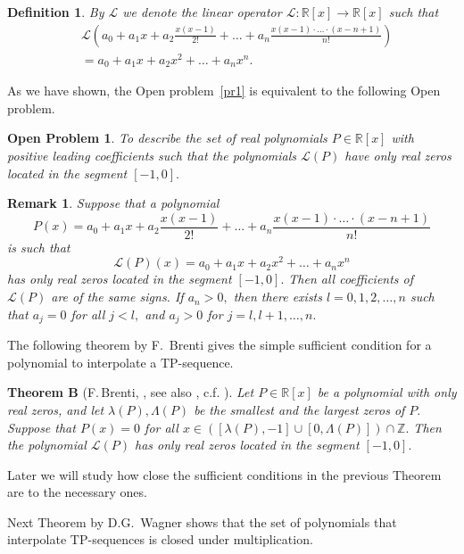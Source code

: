 \documentclass[12pt]{amsart}
\newcounter{count}
\numberwithin{count}{section}
\newtheorem{Remark}[count]{Remark}
\newtheorem{Definition}[count]{Definition}
\newtheorem{Problem}[count]{Open Problem}
\begin{document}
\begin{Definition} By $\mathcal{L}$ we denote the linear operator  $\mathcal{L} : \mathbb{R}[x] \rightarrow 
\mathbb{R}[x]$ such that
\begin{eqnarray}
\label{f4}
&  \mathcal{L}(a_0 + a_1 x +a_2 \frac{x(x-1)}{2!} 
+  \ldots +a_n \frac{x(x-1)\cdot \ldots \cdot (x-n+1)}{n!})
\\  \nonumber &
= a_0 +a_1 x +a_2 x^2 + \ldots + a_n x^n.
\end{eqnarray}
\end{Definition}
As we have shown, the Open problem~\ref{pr1}  is equivalent to the following Open problem.
\begin{Problem}
\label{pr2}
To describe the set of real polynomials $P\in \mathbb{R}[x]$ with positive leading
coefficients such that  the polynomials $\mathcal{L}(P)$ have only real zeros located 
in the segment $[-1, 0].$
\end{Problem}

\begin{Remark}
\label{r1}
Suppose that a polynomial 
$$P(x)= a_0 + a_1 x +a_2 \frac{x(x-1)}{2!} 
+  \ldots +a_n \frac{x(x-1)\cdot \ldots \cdot (x-n+1)}{n!}$$
is such that
$$\mathcal{L}(P)(x)
= a_0 +a_1 x +a_2 x^2 + \ldots + a_n x^n$$ 
has only real zeros located in the segment $[-1, 0].$ Then all
coefficients of $\mathcal{L}(P)$ are of the same signs. If $a_n >0,$
then there exists $l=0, 1, 2, \ldots, n$ such that $a_j=0$ for all
$j < l,$ and $a_j >0$ for $j=l, l+1, \ldots, n.$

\end{Remark}


The following theorem by F.~Brenti gives the simple sufficient condition for a polynomial
to interpolate a $\mathrm{TP}$-sequence.


{\bf Theorem B} (F.\,Brenti, \cite{BrentiMemoir}, see also \cite{BrentiContMath}, c.f. \cite[Lemma 1]{kav}). {\it  Let 
$P\in \mathbb{R}[x]$ be a polynomial with only real zeros, and let $\lambda(P), \Lambda(P)$ 
be the smallest and the largest zeros of $P.$ Suppose that $P(x)=0$ for all $x\in \left(\left[\lambda(P), -1\right] \cup \left[0, \Lambda(P)\right]\right) \cap \mathbb{Z}.$  Then the polynomial $\mathcal{L}(P)$ has only real zeros 
located in the segment $[-1, 0].$ }

Later we will study how close the sufficient conditions in the previous Theorem are to the necessary ones.

Next Theorem by D.G.~Wagner shows that the set of polynomials that interpolate $\mathrm{TP}$-sequences
is closed under multiplication.
\end{document}
